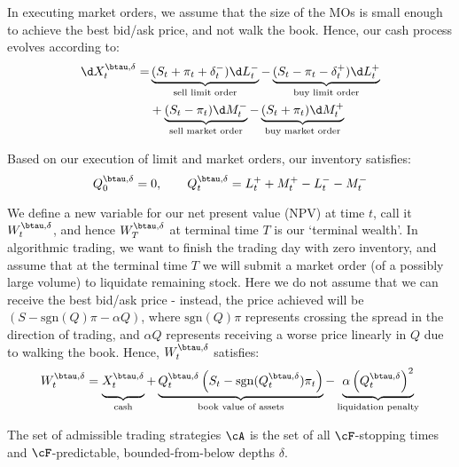 \documentclass[12pt]{article}
\begin{document}
In executing market orders, we assume that the size of the MOs is small enough to achieve the best bid/ask price, and not walk the book. Hence, our cash process evolves according to:
\begin{equation}\label{eq:cashprocess}
\begin{split}
\d X^{\btau, \delta}_t = 	&\underbrace{(S_t + \pi_t + \delta^{-}_t) \d L^{-}_t}_{\text{sell limit order}} - \underbrace{(S_t - \pi_t - \delta^{+}_t) \d L^{+}_t}_{\text{buy limit order}} \\
						&+ \underbrace{(S_t - \pi_t) \d M^{-}_t}_{\text{sell market order}} - \underbrace{(S_t + \pi_t) \d M^{+}_t}_{\text{buy market order}}
\end{split}
\end{equation}

Based on our execution of limit and market orders, our inventory satisfies:
\begin{equation}\label{eq:inventory}
Q^{\btau, \delta}_0 = 0, \qquad Q^{\btau, \delta}_t = L^+_t + M^+_t - L^-_t - M^-_t
\end{equation}

We define a new variable for our net present value (NPV) at time $t$, call it $W^{\btau, \delta}_t$, and hence $W^{\btau, \delta}_T$ at terminal time $T$ is our `terminal wealth'. In algorithmic trading, we want to finish the trading day with zero inventory, and assume that at the terminal time $T$ we will submit a market order (of a possibly large volume) to liquidate remaining stock. Here we do not assume that we can receive the best bid/ask price - instead, the price achieved will be $(S - \mathrm{sgn}(Q)\pi - \alpha Q)$, where $\mathrm{sgn}(Q)\pi$ represents crossing the spread in the direction of trading, and $\alpha Q$ represents receiving a worse price linearly in $Q$ due to walking the book. Hence, $W^{\btau, \delta}_t$ satisfies:
\begin{equation}
\label{eq:terminalwealth}
W^{\btau, \delta}_t = \underbrace{\vphantom{\left( Q^{\btau, \delta}_t) \right)}X^{\btau, \delta}_t}_{\text{cash}}+ \underbrace{Q^{\btau, \delta}_t \left( S_t - \mathrm{sgn}(Q^{\btau, \delta}_t)\pi_t \right)}_{\text{book value of assets}} - \underbrace{\alpha \left( Q^{\btau, \delta}_t \right)^2}_{\text{liquidation penalty}}
\end{equation}

The set of admissible trading strategies $\cA$ is the set of all $\cF$-stopping times and $\cF$-predictable, bounded-from-below depths $\delta$. 
\end{document}
